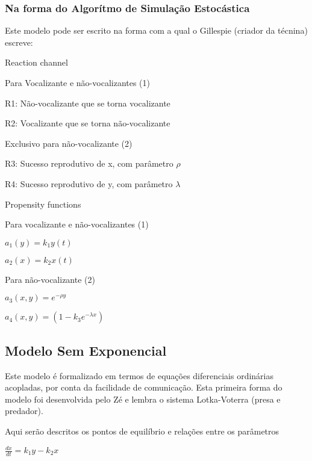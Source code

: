\subsubsection{Na forma do Algorítmo de Simulação Estocástica}
Este modelo pode ser escrito na forma com a qual o Gillespie (criador da técnina) escreve:

\vspace{3 mm}
Reaction channel
\vspace{3 mm}

Para Vocalizante e não-vocalizantes (1)

R1: Não-vocalizante que se torna vocalizante

R2: Vocalizante que se torna não-vocalizante

\vspace{3 mm}
Exclusivo para não-vocalizante (2)

R3: Sucesso reprodutivo de x, com parâmetro $\rho$

R4: Sucesso reprodutivo de y, com parâmetro $\lambda$

\vspace{3 mm}
Propensity functions

\vspace{3 mm}
Para vocalizante e não-vocalizantes (1)

\vspace{3 mm}
$a_1(y)=k_1 y(t)$

\vspace{3 mm}
$a_2(x)=k_2 x(t)$

\vspace{3 mm}
Para não-vocalizante (2)

\vspace{3 mm}
$a_3(x,y)=e^{-\rho y}$

\vspace{3 mm}
$a_4(x,y)=(1-k_3 e^{-\lambda x})$

\subsection{Modelo Sem Exponencial}
Este modelo é formalizado em termos de equações diferenciais ordinárias acopladas, por conta da facilidade de comunicação. Esta primeira forma do modelo foi desenvolvida pelo Zé e lembra o sistema Lotka-Voterra (presa e predador).

Aqui serão descritos os pontos de equilíbrio e relações entre os parâmetros

\vspace{3 mm}
$\frac{dx}{dt} = k_1 y - k_2 x$

